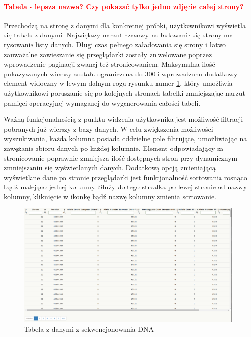 \documentclass[a4paper,12pt,twoside]{article}
\begin{document}
\newpage
\paragraph{\textcolor{red}{
Tabela - lepsza nazwa? Czy pokazać tylko jedno zdjęcie całej strony?}
}
Przechodzą na stronę z danymi dla konkretnej próbki, użytkownikowi wyświetla się 
tabela z danymi. Największy narzut czasowy na ładowanie się strony ma rysowanie listy
danych. Długi czas pełnego załadowania się strony i łatwo zauważalne zawieszanie się przeglądarki
zostały zniwelowane poprzez wprowadzenie paginacji zwanej też stronicowaniem.
Maksymalna ilość pokazywanych wierszy została ograniczona do 300 i wprowadzono dodatkowy 
element widoczny w lewym dolnym rogu rysunku numer \ref{fig:table1pic}, który umożliwia 
użytkownikowi poruszanie się po kolejnych stronach tabelki zmniejszając narzut 
pamięci operacyjnej wymaganej do wygenerowania całości tabeli.  

Ważną funkcjonalnością z punktu widzenia użytkownika jest możliwość filtracji pobranych już wierszy
z bazy danych. W celu zwiększenia możliwości wyszukiwania, każda kolumna posiada oddzielne pole 
filtrujące, umożliwiając na zawężanie zbioru danych po każdej kolumnie. Element odpowiadający
za stronicowanie poprawnie zmniejsza ilość dostępnych stron przy dynamicznym zmniejszaniu się
wyświetlanych danych.
Dodatkową opcją zmieniającą wyświetlane dane po stronie przeglądarki jest 
funkcjonalność sortowania rosnąco bądź malejąco jednej kolumny. Służy do tego strzałka po
lewej stronie od nazwy kolumny, kliknięcie w ikonkę bądź nazwę kolumny zmienia sortowanie.

\begin{figure}[h!]
  \includegraphics[width=\linewidth]{obrazy/aplikacja/table1.png}
  \caption{Tabela z danymi z sekwencjonowania DNA}
  \label{fig:table1pic}
\end{figure}
\end{document}
